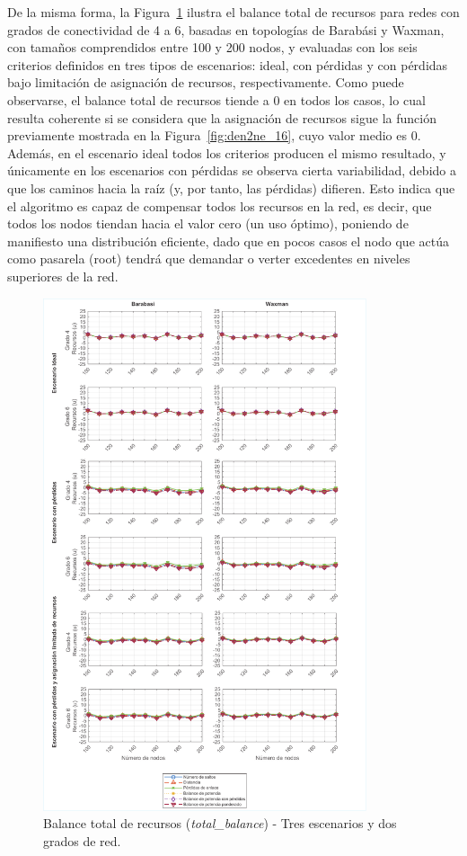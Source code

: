De la misma forma, la Figura~\ref{fig:f2} ilustra el balance total de recursos para redes con grados de conectividad de 4 a 6, basadas en topologías de Barabási y Waxman, con tamaños comprendidos entre 100 y 200 nodos, y evaluadas con los seis criterios definidos en tres tipos de escenarios: ideal, con pérdidas y con pérdidas bajo limitación de asignación de recursos, respectivamente. Como puede observarse, el balance total de recursos tiende a $0$ en todos los casos, lo cual resulta coherente si se considera que la asignación de recursos sigue la función previamente mostrada en la Figura~\ref{fig:den2ne_16}, cuyo valor medio es $0$. Además, en el escenario ideal todos los criterios producen el mismo resultado, y únicamente en los escenarios con pérdidas se observa cierta variabilidad, debido a que los caminos hacia la raíz (y, por tanto, las pérdidas) difieren. Esto indica que el algoritmo es capaz de compensar todos los recursos en la red, es decir, que todos los nodos tiendan hacia el valor cero (un uso óptimo), poniendo de manifiesto una distribución eficiente, dado que en pocos casos el nodo que actúa como pasarela (root) tendrá que demandar o verter excedentes en niveles superiores de la red.


\begin{figure}[H]
    \centering
    \includegraphics[width=0.85\textwidth,angle=0.9]{fig/05_den2ne/den2ne_18.pdf}
    \caption{Balance total de recursos (\textit{total\_balance}) - Tres escenarios y dos grados de red.}
    \label{fig:f2}
\end{figure}

